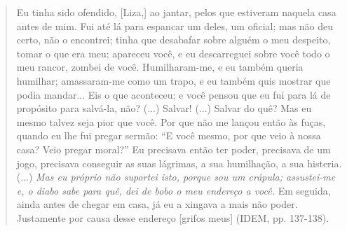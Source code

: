 \begin{quote}
Eu tinha sido ofendido, {[}Liza,{]} ao jantar, pelos que estiveram
naquela casa antes de mim. Fui até lá para espancar um deles, um
oficial; mas não deu certo, não o encontrei; tinha que desabafar sobre
alguém o meu despeito, tomar o que era meu; apareceu você, e eu
descarreguei sobre você todo o meu rancor, zombei de você.
Humilharam-me, e eu também queria humilhar; amassaram-me como um trapo,
e eu também quis mostrar que podia mandar... Eis o que aconteceu; e você
pensou que eu fui para lá de propósito para salvá-la, não? (...) Salvar!
(...) Salvar do quê? Mas eu mesmo talvez seja pior que você. Por que não
me lançou então às fuças, quando eu lhe fui pregar sermão: ``E você
mesmo, por que veio à nossa casa? Veio pregar moral?'' Eu precisava
então ter poder, precisava de um jogo, precisava conseguir as suas
lágrimas, a sua humilhação, a sua histeria. (...) \emph{Mas eu próprio
não suportei isto, porque sou um crápula; assustei-me e, o diabo sabe
para quê, dei de bobo o meu endereço a você.} Em seguida, ainda antes de
chegar em casa, já eu a xingava a mais não poder. Justamente por causa
desse endereço {[}grifos meus{]} (IDEM, pp. 137-138).
\end{quote}

